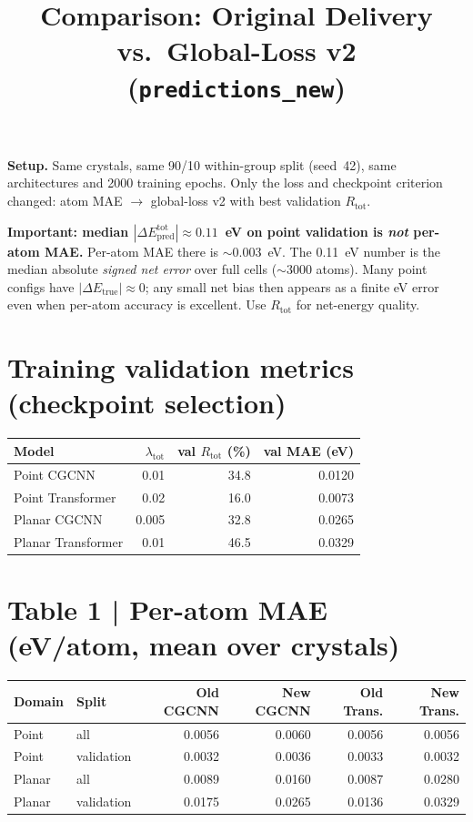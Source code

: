 \documentclass[11pt,a4paper]{article}
\begin{document}
\title{Comparison: Original Delivery vs.\ Global-Loss v2 (\texttt{predictions\_new})}
\date{}
\maketitle

\noindent\textbf{Setup.} Same crystals, same 90/10 within-group split (seed~42), same architectures and 2000 training epochs. Only the loss and checkpoint criterion changed: atom MAE $\rightarrow$ global-loss v2 with best validation $R_{\mathrm{tot}}$.

\medskip
\noindent\textbf{Important: median $|\Delta E_{\mathrm{pred}}^{\mathrm{tot}}| \approx 0.11$~eV on point validation is \emph{not} per-atom MAE.} Per-atom MAE there is $\sim 0.003$~eV. The 0.11~eV number is the median absolute \emph{signed net error} over full cells ($\sim$3000 atoms). Many point configs have $|\Delta E_{\mathrm{true}}|\approx 0$; any small net bias then appears as a finite eV error even when per-atom accuracy is excellent. Use $R_{\mathrm{tot}}$ for net-energy quality.

\section*{Training validation metrics (checkpoint selection)}

\begin{center}
\small
\begin{tabular}{lrrr}
  \toprule
  Model & $\lambda_{\mathrm{tot}}$ & val $R_{\mathrm{tot}}$ (\%) & val MAE (eV) \\
  \midrule
  Point CGCNN & 0.01 & 34.8 & 0.0120 \\
  Point Transformer & 0.02 & 16.0 & 0.0073 \\
  Planar CGCNN & 0.005 & 32.8 & 0.0265 \\
  Planar Transformer & 0.01 & 46.5 & 0.0329 \\
  \bottomrule
\end{tabular}
\end{center}

\section*{Table 1 | Per-atom MAE (eV/atom, mean over crystals)}

\begin{center}
\small
\begin{tabular}{llrrrr}
  \toprule
  Domain & Split & Old CGCNN & New CGCNN & Old Trans. & New Trans. \\
  \midrule
  Point  & all        & 0.0056 & 0.0060 & 0.0056 & 0.0056 \\
  Point  & validation & 0.0032 & 0.0036 & 0.0033 & 0.0032 \\
  Planar & all        & 0.0089 & 0.0160 & 0.0087 & 0.0280 \\
  Planar & validation & 0.0175 & 0.0265 & 0.0136 & 0.0329 \\
  \bottomrule
\end{tabular}
\end{center}
\end{document}
